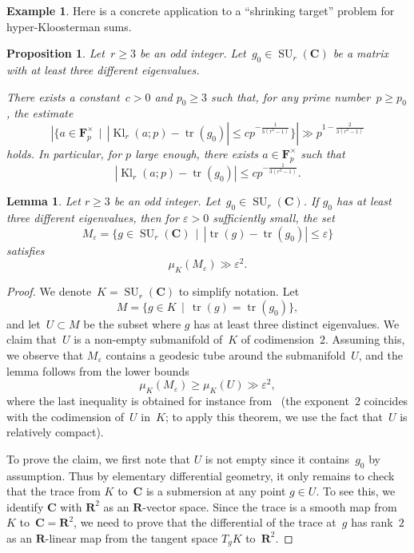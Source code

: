 \documentclass[12pt]{amsart}
\renewcommand{\leq}{\leqslant}
\renewcommand{\geq}{\geqslant}
\newcommand{\Cc}{\mathbf{C}}
\newcommand{\Rr}{\mathbf{R}}
\newcommand{\Ff}{\mathbf{F}}
\DeclareMathOperator{\Kl}{Kl}
\DeclareMathOperator{\Tr}{tr}
\newcommand{\eps}{\varepsilon}
\DeclareMathOperator{\SU}{SU}
\theoremstyle{plain}
\newtheorem{lemma}[theorem]{Lemma}
\newtheorem{proposition}[theorem]{Proposition}
\theoremstyle{remark}
\theoremstyle{definition}
\newtheorem{example}[theorem]{Example}
\renewcommand{\geq}{\geqslant}
\renewcommand{\leq}{\leqslant}
\begin{document}
\begin{example}
  Here is a concrete application to a ``shrinking target'' problem for
  hyper-Kloosterman sums.

  \begin{proposition}\label{pr-hyper-quant}
    Let~$r\geq 3$ be an odd integer. Let~$g_0\in \SU_r(\Cc)$ be a matrix
    with at least three different eigenvalues.

    There exists a constant~$c>0$ and $p_0\geq 3$ such that, for any
    prime number~$p\geq p_0$, the estimate
    \[
      |\{a\in\Ff_p^{\times}\,\mid\, |\Kl_r(a;p)-\Tr(g_0)|\leq
      cp^{-\tfrac{1}{3(r^2-1)}}\}|\gg p^{1-\tfrac{2}{3(r^2-1)}}
    \]
    holds. In particular, for $p$ large enough, there exists
    $a\in\Ff_p^{\times}$ such that
    \[
      |\Kl_r(a;p)-\Tr(g_0)|\leq cp^{-\tfrac{1}{3(r^2-1)}}.
    \]
  \end{proposition}

  \begin{lemma}\label{lm-tube}
    Let $r\geq 3$ be an odd integer.  Let~$g_0\in \SU_r(\Cc)$. If $g_0$
    has at least three different eigenvalues, then for $\eps>0$
    sufficiently small, the set
    \[
      M_{\eps}=\{g\in \SU_r(\Cc)\,\mid\, |\Tr(g)-\Tr(g_0)|\leq\eps\}
    \]
    satisfies
    \[
      \mu_K(M_{\eps})\gg \eps^2.
    \]
  \end{lemma}

  \begin{proof}
    We denote~$K=\SU_r(\Cc)$ to simplify notation.  Let
    \[
      M=\{g\in K\,\mid\, \Tr(g)=\Tr(g_0)\},
    \]
    and let~$U\subset M$ be the subset where $g$ has at least three
    distinct eigenvalues.  We claim that~$U$ is a non-empty
    submanifold of~$K$ of codimension~$2$. Assuming this, we observe
    that $M_{\eps}$ contains a geodesic tube around the
    submanifold~$U$, and the lemma follows from the lower bounds
    \[
      \mu_K(M_{\eps})\geq \mu_K(U)\gg \eps^2,
    \]
    where the last inequality is obtained for instance
    from~\cite[Th.\,9.23]{gray} (the exponent~$2$ coincides with the
    codimension of~$U$ in~$K$; to apply this theorem, we use the fact
    that~$U$ is relatively compact).

    To prove the claim, we first note that $U$ is not empty since it
    contains~$g_0$ by assumption.  Thus by elementary differential
    geometry, it only remains to check that the trace from $K$ to~$\Cc$
    is a submersion at any point $g\in U$.  To see this, we identify
    $\Cc$ with $\Rr^2$ as an $\Rr$-vector space.  Since the trace is a
    smooth map from~$K$ to~$\Cc=\Rr^2$, we need to prove that the
    differential of the trace at~$g$ has rank~$2$ as an $\Rr$-linear map
    from the tangent space $T_gK$ to~$\Rr^2$.


\end{proof}
\end{example}
\end{document}
